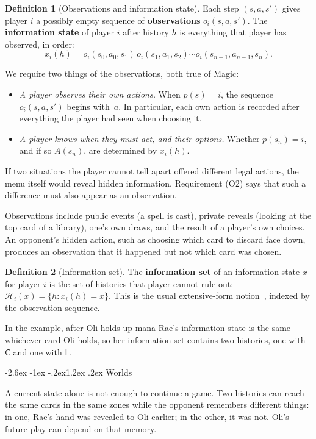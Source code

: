 \documentclass[11pt,a4paper]{article}
\makeatletter
\renewcommand\subsection{\@startsection{subsection}{2}{\z@}
  {-2.6ex \@plus -1ex \@minus -.2ex}{1.2ex \@plus .2ex}
  {\normalfont\large\sffamily\bfseries\color{ink}}}
\theoremstyle{plain}
\theoremstyle{definition}
\newtheorem{definition}{Definition}
\newcommand{\term}[1]{\textbf{#1}}
\newcommand{\Hset}{\mathcal H}
\newcommand{\Cs}{\mathsf C}
\newcommand{\Ld}{\mathsf L}
\makeatother
\begin{document}
\begin{definition}[Observations and information state]
Each step $(s,a,s')$ gives player $i$ a possibly empty sequence of
\term{observations} $o_i(s,a,s')$. The \term{information state} of player $i$
after history $h$ is everything that player has observed, in order:
\[
x_i(h)=o_i(s_0,a_0,s_1)\,o_i(s_1,a_1,s_2)\cdots o_i(s_{n-1},a_{n-1},s_n).
\]
\end{definition}

We require two things of the observations, both true of Magic:
\begin{itemize}
\item[(O1)] \emph{A player observes their own actions.} When
  $p(s)=i$, the sequence $o_i(s,a,s')$ begins with~$a$. In particular, each own
  action is recorded after everything the player had seen when choosing it.
\item[(O2)] \emph{A player knows when they must act, and their
  options.} Whether $p(s_n)=i$, and if so $A(s_n)$, are determined by $x_i(h)$.
\end{itemize}
If two situations the player cannot tell apart offered different legal
actions, the menu itself would reveal hidden information. Requirement
(O2) says that such a difference must also appear as an observation.

Observations include public events (a spell is cast), private reveals
(looking at the top card of a library), one's own draws, and the result of
a player's own choices. An opponent's hidden action, such as choosing
which card to discard face down, produces an observation that it happened but
not which card was chosen.

\begin{definition}[Information set]
The \term{information set} of an information state $x$ for player $i$ is the
set of histories that player cannot rule out:
$\Hset_i(x)=\{h: x_i(h)=x\}$. This is the usual extensive-form
notion~\cite{osborne1994}, indexed by the observation sequence.
\end{definition}

In the example, after Oli holds up mana Rae's information state is the same
whichever card Oli holds, so her information set contains two histories, one
with $\Cs$ and one with $\Ld$.

\subsection{Worlds}

A current state alone is not enough to continue a game. Two histories can
reach the same cards in the same zones while the opponent remembers different
things: in one, Rae's hand was revealed to Oli earlier; in the other, it was
not. Oli's future play can depend on that memory.
\end{document}

